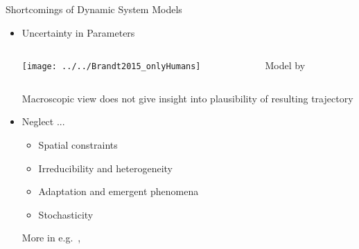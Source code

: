 \begin{frame}{Shortcomings of Dynamic System Models}
\begin{itemize}
\item Uncertainty in Parameters\\ \vspace{0.3cm}
{\centering 
	\begin{columns}
		\begin{column}{0.7\textwidth}
			\texttt{[image: ../../Brandt2015\_onlyHumans]}
		\end{column}
		\begin{column}{0.15\textwidth}
			{\footnotesize Model by \citet{Brandt2015}}
		\end{column}
	\end{columns}
} \vspace{0.3cm}
\ra Macroscopic view does not give insight into plausibility of resulting trajectory
\pause\item Neglect ...
\begin{itemize}
\item Spatial constraints
\item Irreducibility and heterogeneity
\item Adaptation and emergent phenomena
\item Stochasticity
\end{itemize} 
\vfill 
{\tiny More in e.g.\ \citet{Bookstaber2019}, \citet{Bonabeau2002}}
\end{itemize}
\end{frame}

